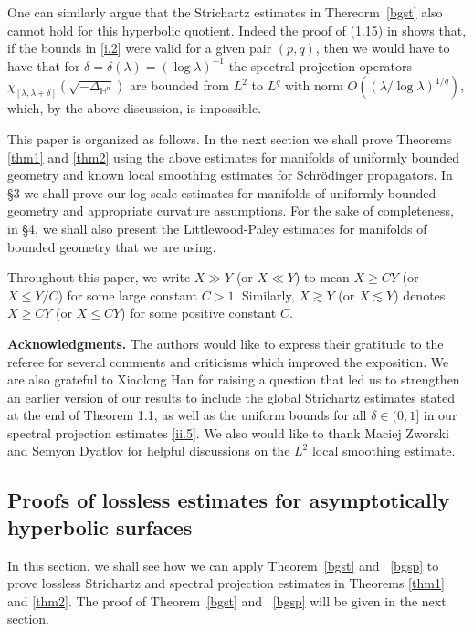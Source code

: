 \documentclass[10pt]{amsart}
\newcommand{\newsection}[1]
{\subsection{#1}\setcounter{theorem}{0} \setcounter{equation}{0}
\par\noindent}
\newcommand{\la}{\lambda}
\newcommand{\1}{{\bf 1}}
\begin{document}
One can similarly argue that the Strichartz estimates in Thereorm~\ref{bgst} also cannot hold for this hyperbolic quotient.
Indeed the proof of (1.15) in \cite{HSst} shows that, if the bounds in \eqref{i.2} were valid for a given pair $(p,q)$, then we would
have to have that for $\delta=\delta(\la)=(\log\la)^{-1}$ the spectral projection operators $\chi_{[\la,\la+\delta]}(\sqrt{-\Delta_{{\mathbb H}^n}})$
are bounded from $L^2$ to $L^q$ with norm $O((\la/\log\la)^{1/q})$, which, by the above discussion, is impossible.


This paper is organized as follows. In the next section we shall prove Theorems \ref{thm1} and \ref{thm2} using the above estimates for 
manifolds of uniformly bounded geometry and known local smoothing estimates for Schr\"odinger propagators.  
 In \S3 we shall prove our log-scale estimates for manifolds of uniformly bounded geometry
and appropriate curvature assumptions.  For the sake of completeness, in \S4, we shall also present the Littlewood-Paley estimates for manifolds of bounded
geometry that we are using.

Throughout this paper, we write $X\gg Y$ (or $X\ll Y$) to mean $X\ge C Y$ (or $X\le Y/C$) for some large constant $C>1$. Similarly, 
$X\gtrsim Y$ (or $X\lesssim Y$) denotes $X\ge C Y$ (or $X\le CY$) for some positive constant $C$.

{\bf Acknowledgments.}  The authors would like to express their gratitude to the referee for several comments and criticisms which improved the exposition.
We are also grateful to Xiaolong Han for raising a question that led us to strengthen an earlier version of our results to include
the global Strichartz estimates stated at the end of Theorem 1.1, as well as the uniform bounds for all $\delta\in (0,1]$
 in our spectral projection
estimates \eqref{ii.5}. 
 We also
would like to thank Maciej Zworski and Semyon Dyatlov for helpful discussions on the $L^2$ local smoothing estimate.



\newsection{Proofs of lossless estimates for asymptotically hyperbolic surfaces}


In this section, we shall see how we can apply Theorem~\ref{bgst} and ~\ref{bgsp} to prove lossless Strichartz and spectral projection estimates 
in Theorems \ref{thm1} and \ref{thm2}. The proof of Theorem~\ref{bgst} and ~\ref{bgsp} will be given in the next section.
\end{document}
